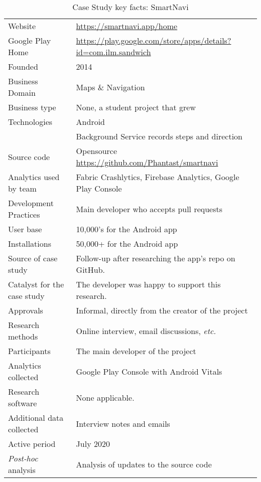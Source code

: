 {\renewcommand{\arraystretch}{0.8}%
\begin{table*}[h]
    \centering
    \small
    \setlength{\tabcolsep}{6pt}
    \begin{tabular}{lp{9cm}}
       \toprule
       Website &\url{https://smartnavi.app/home} \\
       Google Play Home & \url{https://play.google.com/store/apps/details?id=com.ilm.sandwich} \\
       Founded & 2014 \\
       Business Domain & Maps \& Navigation \\
       Business type & None, a student project that grew \\
       Technologies  & Android \\
       & Background Service records steps and direction \\
       Source code  & Opensource \url{https://github.com/Phantast/smartnavi} \\
       Analytics used by team & Fabric Crashlytics, Firebase Analytics, Google Play Console \\
       Development Practices & Main developer who accepts pull requests \\
       \arrayrulecolor{blue!20}\midrule
       User base & 10,000's for the Android app \\
       Installations & 50,000+ for the Android app \\
       \arrayrulecolor{blue!20}\midrule
       Source of case study &Follow-up after researching the app's repo on GitHub. \\
       Catalyst for the case study & The developer was happy to support this research. \\
       Approvals &Informal, directly from the creator of the project \\
       \arrayrulecolor{blue!20}\midrule
       Research methods &Online interview, email discussions, \emph{etc.} \\
       Participants &The main developer of the project \\
       Analytics collected &Google Play Console with Android Vitals \\
       Research software & None applicable. \\
       Additional data collected &Interview notes and emails \\
       Active period & July 2020 \\
       \arrayrulecolor{blue!20}\midrule
       \emph{Post-hoc} analysis &Analysis of updates to the source code \\
       \bottomrule
    \end{tabular}
    \caption{Case Study key facts: SmartNavi}
    \label{tab:smartnavi_anaytics_overview}
\end{table*}
}


